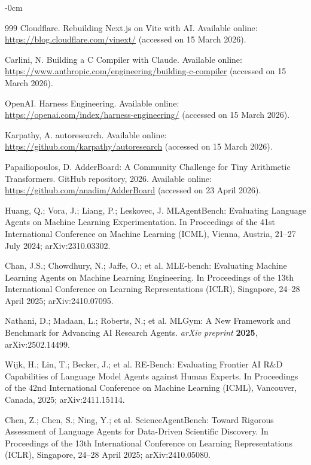 \documentclass[universe,article,submit,pdftex,oneauthor]{Definitions/mdpi}
\begin{document}
\begin{adjustwidth}{-\extralength}{0cm}
\begin{thebibliography}{999}
Cloudflare. Rebuilding Next.js on Vite with AI. Available online: \url{https://blog.cloudflare.com/vinext/} (accessed on 15 March 2026).

Carlini, N. Building a C Compiler with Claude. Available online: \url{https://www.anthropic.com/engineering/building-c-compiler} (accessed on 15 March 2026).

OpenAI. Harness Engineering. Available online: \url{https://openai.com/index/harness-engineering/} (accessed on 15 March 2026).

Karpathy, A. autoresearch. Available online: \url{https://github.com/karpathy/autoresearch} (accessed on 15 March 2026).

Papailiopoulos, D. AdderBoard: A Community Challenge for Tiny Arithmetic Transformers. GitHub repository, 2026. Available online: \url{https://github.com/anadim/AdderBoard} (accessed on 23 April 2026).

Huang, Q.; Vora, J.; Liang, P.; Leskovec, J. MLAgentBench: Evaluating Language Agents on Machine Learning Experimentation. In Proceedings of the 41st International Conference on Machine Learning (ICML), Vienna, Austria, 21--27 July 2024; arXiv:2310.03302.

Chan, J.S.; Chowdhury, N.; Jaffe, O.; et al. MLE-bench: Evaluating Machine Learning Agents on Machine Learning Engineering. In Proceedings of the 13th International Conference on Learning Representations (ICLR), Singapore, 24--28 April 2025; arXiv:2410.07095.

Nathani, D.; Madaan, L.; Roberts, N.; et al. MLGym: A New Framework and Benchmark for Advancing AI Research Agents. \textit{arXiv preprint} \textbf{2025}, arXiv:2502.14499.

Wijk, H.; Lin, T.; Becker, J.; et al. RE-Bench: Evaluating Frontier AI R\&D Capabilities of Language Model Agents against Human Experts. In Proceedings of the 42nd International Conference on Machine Learning (ICML), Vancouver, Canada, 2025; arXiv:2411.15114.

Chen, Z.; Chen, S.; Ning, Y.; et al. ScienceAgentBench: Toward Rigorous Assessment of Language Agents for Data-Driven Scientific Discovery. In Proceedings of the 13th International Conference on Learning Representations (ICLR), Singapore, 24--28 April 2025; arXiv:2410.05080.


\end{thebibliography}
\end{adjustwidth}
\end{document}

